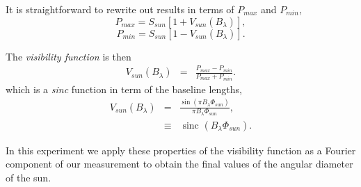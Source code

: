 It is straightforward to rewrite out results in terms of $P_{max}$ and $P_{min}$,
\begin{equation}
P_{max} = S_{sun} [1 + V_{sun}(B_{\lambda})], 
\end{equation}
\begin{equation}
 P_{min} = S_{sun }[1-V_{sun}(B_{\lambda})].
\end{equation}

The {\it visibility function}  is then
\begin{eqnarray}
V_{sun}(B_{\lambda}) &=& \frac{P_{max} - P_{min}}{P_{max} + P_{min}}.
\label{vis}
\end{eqnarray}
which is a {\it sinc} function in term of  the baseline lengths,
\begin{eqnarray}
V_{sun}(B_{\lambda}) &=& \frac{\sin  ( \pi   B_{\lambda} \Phi_{sun}  )}{ \pi B_{\lambda} {\Phi_{sun}}}, \nonumber \\
&\equiv& \mbox{ sinc } (B_{\lambda} {\Phi_{sun}}).
\label{vissinc}
\end{eqnarray}


In this experiment we apply  these properties of the visibility function as a Fourier component of our measurement to obtain the final values of the angular diameter of the sun.


